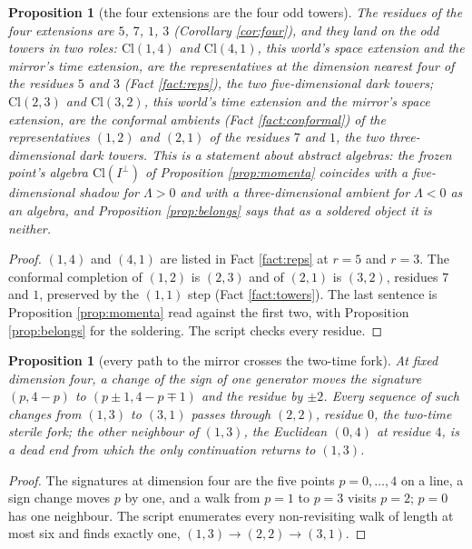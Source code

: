\documentclass[11pt]{article}
\newtheorem{proposition}[theorem]{Proposition}
\theoremstyle{definition}
\newcommand{\Cl}{\mathrm{Cl}}
\begin{document}
\begin{proposition}[the four extensions are the four odd towers]\label{prop:clock}
The residues of the four extensions are $5$, $7$, $1$, $3$ (Corollary \ref{cor:four}), and they land on the odd towers in two roles: $\Cl(1,4)$ and $\Cl(4,1)$, this world's space extension and the mirror's time extension, are the representatives at the dimension nearest four of the residues $5$ and $3$ (Fact \ref{fact:reps}), the two five-dimensional dark towers; $\Cl(2,3)$ and $\Cl(3,2)$, this world's time extension and the mirror's space extension, are the conformal ambients (Fact \ref{fact:conformal}) of the representatives $(1,2)$ and $(2,1)$ of the residues $7$ and $1$, the two three-dimensional dark towers. This is a statement about abstract algebras: the frozen point's algebra $\Cl(I^{\perp})$ of Proposition \ref{prop:momenta} coincides with a five-dimensional shadow for $\Lambda > 0$ and with a three-dimensional ambient for $\Lambda < 0$ as an algebra, and Proposition \ref{prop:belongs} says that as a soldered object it is neither.
\end{proposition}

\begin{proof}
$(1,4)$ and $(4,1)$ are listed in Fact \ref{fact:reps} at $r = 5$ and $r = 3$. The conformal completion of $(1,2)$ is $(2,3)$ and of $(2,1)$ is $(3,2)$, residues $7$ and $1$, preserved by the $(1,1)$ step (Fact \ref{fact:towers}). The last sentence is Proposition \ref{prop:momenta} read against the first two, with Proposition \ref{prop:belongs} for the soldering. The script checks every residue.
\end{proof}

\begin{proposition}[every path to the mirror crosses the two-time fork]\label{prop:path}
At fixed dimension four, a change of the sign of one generator moves the signature $(p, 4-p)$ to $(p \pm 1, 4 - p \mp 1)$ and the residue by $\pm 2$. Every sequence of such changes from $(1,3)$ to $(3,1)$ passes through $(2,2)$, residue $0$, the two-time sterile fork; the other neighbour of $(1,3)$, the Euclidean $(0,4)$ at residue $4$, is a dead end from which the only continuation returns to $(1,3)$.
\end{proposition}

\begin{proof}
The signatures at dimension four are the five points $p = 0, \ldots, 4$ on a line, a sign change moves $p$ by one, and a walk from $p = 1$ to $p = 3$ visits $p = 2$; $p = 0$ has one neighbour. The script enumerates every non-revisiting walk of length at most six and finds exactly one, $(1,3) \to (2,2) \to (3,1)$.
\end{proof}
\end{document}
